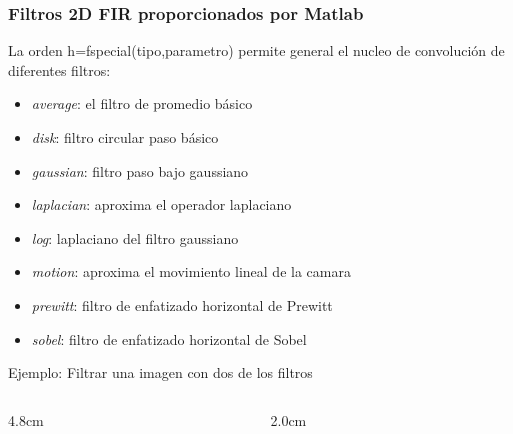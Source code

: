 \documentclass[handout]{beamer}
\numberwithin{section}{part}
\begin{document}
\begin{frame}
\frametitle{Filtros 2D FIR proporcionados por Matlab}

\small

La orden \alert{h=fspecial(tipo,parametro)} permite general el nucleo de convoluci\'{o}n de diferentes filtros:

\footnotesize

\begin{itemize}

\item \alert{\textit{average}}: el filtro de promedio b\'{a}sico

\item \alert{\textit{disk}}: filtro circular paso b\'{a}sico

\item \alert{\textit{gaussian}}: filtro paso bajo gaussiano

\item \alert{\textit{laplacian}}: aproxima el operador laplaciano

\item \alert{\textit{log}}: laplaciano del filtro gaussiano

\item \alert{\textit{motion}}: aproxima el movimiento lineal de la camara

\item \alert{\textit{prewitt}}: filtro de enfatizado horizontal de Prewitt

\item \alert{\textit{sobel}}: filtro de enfatizado horizontal de Sobel

\end{itemize}

\small

\vspace{0.0cm}

\color{olivegreen}Ejemplo: \color{black} Filtrar una imagen con dos de los filtros

\vspace{-0.8cm}


\begin{columns}[t]

\begin{column}{4.8cm}



\end{column}

\begin{column}{2.0cm}


\end{column}
\end{columns}
\end{frame}
\end{document}
